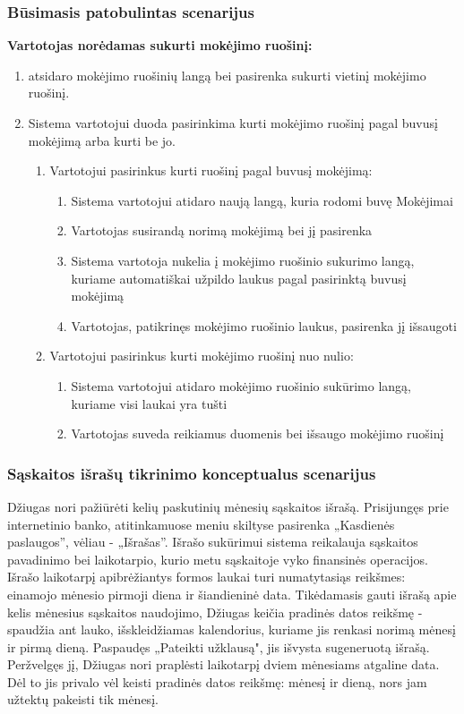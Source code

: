 \documentclass{VUMIFPSkursinis}
\begin{document}
\subsubsection{Būsimasis patobulintas scenarijus}
\begin{center}
	\textbf{Vartotojas norėdamas sukurti mokėjimo ruošinį:}
\end{center}
\begin{enumerate}
	\item atsidaro mokėjimo ruošinių langą bei pasirenka sukurti vietinį mokėjimo ruošinį.
	\item Sistema vartotojui duoda pasirinkima kurti mokėjimo ruošinį pagal buvusį mokėjimą arba kurti be jo.
	\begin{enumerate}
		\item Vartotojui pasirinkus kurti ruošinį pagal buvusį mokėjimą:
		\begin{enumerate}
			\item Sistema vartotojui atidaro naują langą, kuria rodomi buvę Mokėjimai
			\item Vartotojas susirandą norimą mokėjimą bei jį pasirenka
			\item Sistema vartotoja nukelia į mokėjimo ruošinio sukurimo langą, kuriame automatiškai užpildo laukus pagal pasirinktą buvusį mokėjimą
			\item Vartotojas, patikrinęs mokėjimo ruošinio laukus, pasirenka jį išsaugoti
		\end{enumerate}
		\item Vartotojui pasirinkus kurti mokėjimo ruošinį nuo nulio:
		\begin{enumerate}
			\item Sistema vartotojui atidaro mokėjimo ruošinio sukūrimo langą, kuriame visi laukai yra tušti
			\item Vartotojas suveda reikiamus duomenis bei išsaugo mokėjimo ruošinį	
		\end{enumerate}
	\end{enumerate}
\end{enumerate}
\subsubsection{Sąskaitos išrašų tikrinimo konceptualus scenarijus}
Džiugas nori pažiūrėti kelių paskutinių mėnesių sąskaitos išrašą. Prisijungęs prie internetinio banko, atitinkamuose meniu skiltyse pasirenka „Kasdienės paslaugos”, vėliau - „Išrašas”. Išrašo sukūrimui sistema reikalauja sąskaitos pavadinimo bei laikotarpio, kurio metu sąskaitoje vyko finansinės operacijos. Išrašo laikotarpį apibrėžiantys formos laukai turi numatytasiąs reikšmes: einamojo mėnesio pirmoji diena ir šiandieninė data. Tikėdamasis gauti išrašą apie kelis mėnesius sąskaitos naudojimo, Džiugas keičia pradinės datos reikšmę - spaudžia ant lauko, išskleidžiamas kalendorius, kuriame jis renkasi norimą mėnesį ir pirmą dieną. Paspaudęs „Pateikti užklausą", jis išvysta sugeneruotą išrašą. Peržvelgęs jį, Džiugas nori praplėsti laikotarpį dviem mėnesiams atgaline data. Dėl to jis privalo vėl keisti pradinės datos reikšmę: mėnesį ir dieną, nors jam užtektų pakeisti tik mėnesį.
\end{document}
